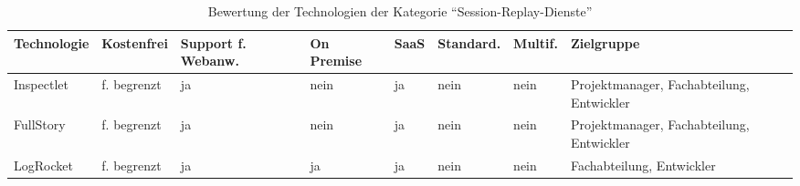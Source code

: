 \begin{table}[H]%
\centering
\addtolength{\leftskip}{-2cm}
\addtolength{\rightskip}{-2cm}
\begin{tabular}{|p{3.05cm}|p{1.8cm}|p{1.7cm}|p{1.2cm}|p{1.3cm}|p{1.7cm}|p{1.3cm}|p{2.6cm}|}
\hline
Technologie & Kostenfrei & Support f. Webanw. & On \mbox{Premise} & SaaS & Standard. & Multif. & Zielgruppe \\
\hline
Inspectlet & f. begrenzt & ja & nein & ja & nein & nein & Projektmanager, Fachabteilung, Entwickler \\
\hline
FullStory & f. begrenzt & ja & nein & ja & nein & nein & Projektmanager, Fachabteilung, Entwickler \\
\hline
LogRocket & f. begrenzt & ja & ja & ja & nein & nein & Fachabteilung, Entwickler \\
\hline
\end{tabular}
\caption{Bewertung der Technologien der Kategorie \enquote{Session-Replay-Dienste}}
\label{tab:technologie-bewertung-session-replay-dienste}
\end{table}
